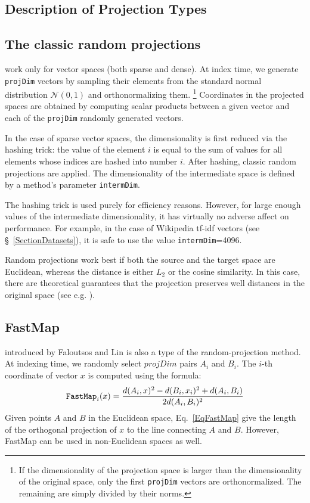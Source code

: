 \documentclass[runningheads,a4paper]{llncs}
\newcommand{\ttt}[1]{\texttt{#1}}
\begin{document}

%


\begin{appendix}
\section{Description of Projection Types}\label{SectionProjDetails}
\subsection{The classic random projections} work only for vector spaces (both sparse and dense).
At index time, we generate \ttt{projDim} vectors by sampling their elements from
the standard normal distribution $\mathcal{N}(0,1)$ and orthonormalizing them. \footnote{If 
the dimensionality of the projection space is larger than the dimensionality of the original
space, only the first \ttt{projDim} vectors are orthonormalized. The remaining are simply
divided by their norms.}
Coordinates in the projected spaces are obtained by computing scalar products
between a given vector and each of the \ttt{projDim} randomly generated vectors.

In the case of sparse vector spaces, the dimensionality is first reduced via the hashing trick:
the value of the element $i$ is equal to the sum of values for all elements whose indices are 
hashed into number $i$. 
After hashing, classic random projections are applied. 
The dimensionality of the intermediate space is defined by a method's parameter \ttt{intermDim}. 

The hashing trick is used purely for efficiency reasons. 
However, for large enough values of the intermediate
dimensionality, it has virtually no adverse affect on performance.
For example, in the case of Wikipedia tf-idf vectors (see \S~\ref{SectionDatasets}),
it is safe to use the value \ttt{intermDim}=4096.

Random projections work best if both the source and the target space are Euclidean,
whereas the distance is either $L_2$ or the cosine similarity.
In this case, there are theoretical guarantees that the projection preserves
well distances in the original space (see e.g. \cite{bingham2001random}).

\subsection{FastMap} introduced by Faloutsos and Lin \cite{faloutsos1995fastmap}
is also a type of the random-projection method. 
At indexing time, we randomly select $projDim$ pairs $A_i$ and $B_i$.
The \mbox{$i$-th} coordinate of vector $x$ is computed using the formula:
\begin{equation}\label{EqFastMap}
\mbox{\ttt{FastMap}}_{i}(x)  = \frac{d(A_i,x)^2 - d(B_i,x_i)^2 + d(A_i,B_i)}{2 d(A_i,B_i)^2}
\end{equation}
Given points $A$ and $B$ in the Euclidean space, Eq.~\ref{EqFastMap} give the length of the
orthogonal projection of $x$ to the line connecting $A$ and $B$.
However, FastMap can be used in non-Euclidean spaces as well.


\end{appendix}
\end{document}
